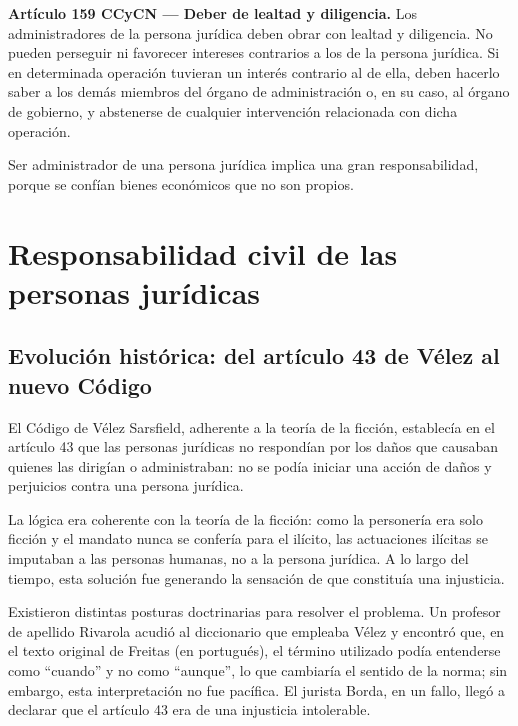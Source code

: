 \documentclass[12pt,oneside]{book}
\begin{document}
\begin{important}
\textbf{Artículo 159 CCyCN --- Deber de lealtad y diligencia.} Los administradores de la persona jurídica deben obrar con lealtad y diligencia. No pueden perseguir ni favorecer intereses contrarios a los de la persona jurídica. Si en determinada operación tuvieran un interés contrario al de ella, deben hacerlo saber a los demás miembros del órgano de administración o, en su caso, al órgano de gobierno, y abstenerse de cualquier intervención relacionada con dicha operación.
\end{important}

Ser administrador de una persona jurídica implica una gran responsabilidad, porque se confían bienes económicos que no son propios.

\chapter{Responsabilidad civil de las personas jurídicas}

\section{Evolución histórica: del artículo 43 de Vélez al nuevo Código}

El Código de Vélez Sarsfield, adherente a la teoría de la ficción, establecía en el artículo 43 que las personas jurídicas no respondían por los daños que causaban quienes las dirigían o administraban: no se podía iniciar una acción de daños y perjuicios contra una persona jurídica.

La lógica era coherente con la teoría de la ficción: como la personería era solo ficción y el mandato nunca se confería para el ilícito, las actuaciones ilícitas se imputaban a las personas humanas, no a la persona jurídica. A lo largo del tiempo, esta solución fue generando la sensación de que constituía una injusticia.

Existieron distintas posturas doctrinarias para resolver el problema. Un profesor de apellido Rivarola acudió al diccionario que empleaba Vélez y encontró que, en el texto original de Freitas (en portugués), el término utilizado podía entenderse como ``cuando'' y no como ``aunque'', lo que cambiaría el sentido de la norma; sin embargo, esta interpretación no fue pacífica. El jurista Borda, en un fallo, llegó a declarar que el artículo 43 era de una injusticia intolerable.
\end{document}
